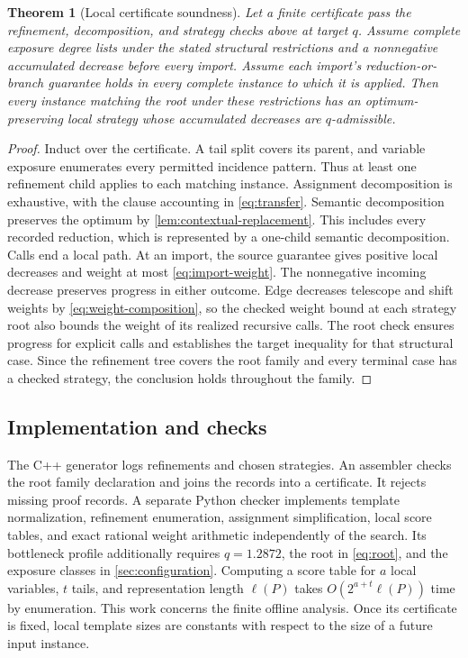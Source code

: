 \documentclass[10pt,twoside]{article}
\newtheorem{theorem}{Theorem}
\theoremstyle{definition}
\theoremstyle{remark}
\begin{document}
\begin{theorem}[Local certificate soundness]
\label{thm:local-soundness}
Let a finite certificate pass the refinement, decomposition, and strategy
checks above at target $q$. Assume complete exposure degree lists under
the stated structural restrictions and a nonnegative accumulated decrease
before every import. Assume each import's reduction-or-branch guarantee
holds in every complete instance to which it is applied. Then every instance
matching the root under these restrictions has an optimum-preserving
local strategy whose accumulated decreases are
$q$-admissible.
\end{theorem}
\begin{proof}
Induct over the certificate. A tail split covers its parent, and variable
exposure enumerates every permitted incidence pattern. Thus at least one
refinement child applies to each matching instance. Assignment decomposition
is exhaustive, with the clause accounting in \cref{eq:transfer}. Semantic
decomposition preserves the optimum by \cref{lem:contextual-replacement}.
This includes every recorded reduction, which is represented by a one-child
semantic decomposition. Calls end a local path. At an import, the source
guarantee gives positive local decreases and weight at most
\cref{eq:import-weight}. The nonnegative incoming decrease preserves
progress in either outcome. Edge decreases telescope and shift weights by
\cref{eq:weight-composition}, so the checked weight bound at each strategy
root also bounds the weight of its realized recursive calls. The root check
ensures progress for explicit
calls and establishes the target inequality for that structural case.
Since the refinement tree covers the root family and every terminal case
has a checked strategy, the conclusion holds throughout the family.
\end{proof}

\subsection{Implementation and checks}

The C++ generator logs refinements and chosen strategies. An assembler checks
the root family declaration and joins the records into a certificate. It
rejects missing proof records. A separate Python checker
implements template normalization, refinement enumeration, assignment
simplification, local score tables, and exact rational weight arithmetic
independently of the search. Its bottleneck profile additionally requires
$q=1.2872$, the root in \cref{eq:root}, and the exposure classes in
\cref{sec:configuration}. Computing a score table for $a$ local variables,
$t$ tails, and representation length $\ell(P)$ takes
$O(2^{a+t}\ell(P))$ time by enumeration. This work concerns the finite offline
analysis. Once its certificate is fixed, local template sizes are constants
with respect to the size of a future input instance.
\end{document}
